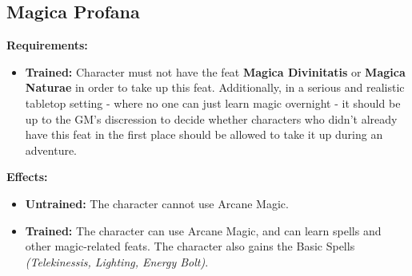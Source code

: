 \subsection{Magica Profana}
\begin{table}[!ht]
\centering
{}
\end{table}
\textbf{Requirements:}
\begin{itemize}
	\item \textbf{Trained:} Character must not have the feat \textbf{Magica Divinitatis} or \textbf{Magica Naturae} in order to take up this feat. Additionally, in a serious and realistic tabletop setting - where no one can just learn magic overnight - it should be up to the GM's discression to decide whether characters who didn't already have this feat in the first place should be allowed to take it up during an adventure.
\end{itemize}
\textbf{Effects:}
\begin{itemize}
	\item \textbf{Untrained:} The character cannot use Arcane Magic.
	\item \textbf{Trained:} The character can use Arcane Magic, and can learn spells and other magic-related feats. The character also gains the Basic Spells \textit{(Telekinessis, Lighting, Energy Bolt)}.
\end{itemize}\newpage
